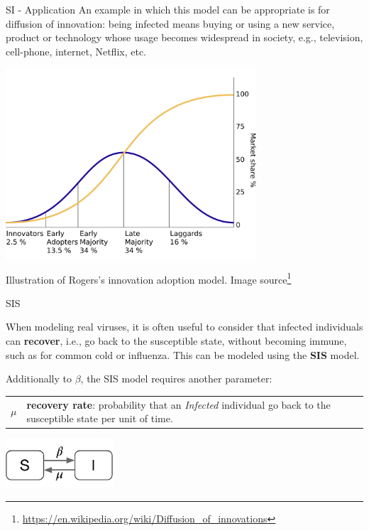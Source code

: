\documentclass[a4paper,11pt]{book}
\begin{document}
\begin{textbox}{SI - Application}
An example in which this model can be appropriate is for diffusion of innovation: being infected means buying or using a new service, product or technology whose usage becomes widespread in society, e.g., television, cell-phone, internet, Netflix, etc.

\centering

\colorbox{white}{\includegraphics[width=0.7\textwidth]{pics/Diffusion_of_ideas.png}}

Illustration of Rogers's innovation adoption model. Image source\footnote{\url{https://en.wikipedia.org/wiki/Diffusion_of_innovations}}
\end{textbox}











\begin{textbox}{SIS}

When modeling real viruses, it is often useful to consider that infected individuals can \textbf{recover}, i.e., go back to the susceptible state, without becoming immune, such as for common cold or influenza. This can be modeled using the \textbf{SIS} model.

Additionally to $\beta$, the SIS model requires another parameter:

\begin{tabular}{p{}|p{}}\scriptsize

$\mu$ & \textbf{recovery rate}: probability that an \textit{Infected} individual go back to the susceptible state per unit of time.
\end{tabular}
\centering
\vspace{0.3cm}
\includegraphics[width=0.3\textwidth]{pics/SIS.pdf}
\end{textbox}
\end{document}
